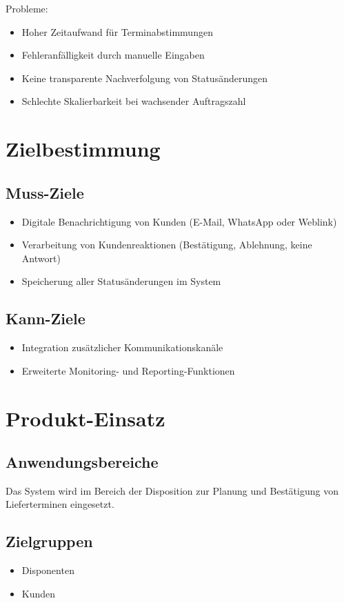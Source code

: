 \documentclass[12pt,a4paper]{article}
\begin{document}
Probleme:
\begin{itemize}
    \item Hoher Zeitaufwand für Terminabstimmungen
    \item Fehleranfälligkeit durch manuelle Eingaben
    \item Keine transparente Nachverfolgung von Statusänderungen
    \item Schlechte Skalierbarkeit bei wachsender Auftragszahl
\end{itemize}

\section{Zielbestimmung}
\subsection{Muss-Ziele}
\begin{itemize}
    \item Digitale Benachrichtigung von Kunden (E-Mail, WhatsApp oder Weblink)
    \item Verarbeitung von Kundenreaktionen (Bestätigung, Ablehnung, keine Antwort)
    \item Speicherung aller Statusänderungen im System
\end{itemize}

\subsection{Kann-Ziele}
\begin{itemize}
    \item Integration zusätzlicher Kommunikationskanäle
    \item Erweiterte Monitoring- und Reporting-Funktionen
\end{itemize}

\section{Produkt-Einsatz}
\subsection{Anwendungsbereiche}
Das System wird im Bereich der Disposition zur Planung und Bestätigung von Lieferterminen eingesetzt.

\subsection{Zielgruppen}
\begin{itemize}
    \item Disponenten
    \item Kunden
\end{itemize}
\end{document}
